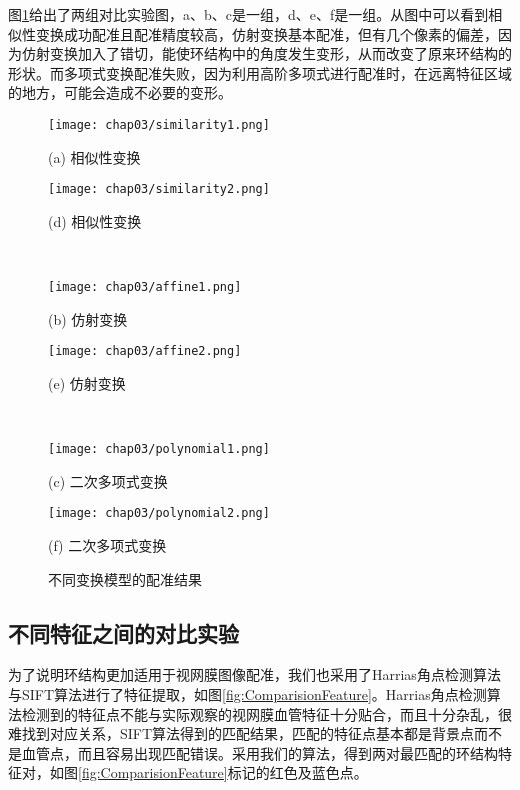 图\ref{fig:transform-fig}给出了两组对比实验图，a、b、c是一组，d、e、f是一组。从图中可以看到相似性变换成功配准且配准精度较高，仿射变换基本配准，但有几个像素的偏差，因为仿射变换加入了错切，能使环结构中的角度发生变形，从而改变了原来环结构的形状。而多项式变换配准失败，因为利用高阶多项式进行配准时，在远离特征区域的地方，可能会造成不必要的变形。
\begin{figure}
\centering

\begin{minipage}[b]{0.48\textwidth} 
      \centering 
      \texttt{[image: chap03/similarity1.png]}
        \centerline{(a) 相似性变换}\medskip
\end{minipage}
  \begin{minipage}[b]{0.48\textwidth}
    \centering
    \texttt{[image: chap03/similarity2.png]}
      \centerline{(d) 相似性变换}\medskip
  \end{minipage}
\\
  \begin{minipage}[b]{0.48\textwidth}
    \centering
    \texttt{[image: chap03/affine1.png]}
      \centerline{(b) 仿射变换}\medskip
  \end{minipage}
 \begin{minipage}[b]{0.48\textwidth}
    \centering
      \texttt{[image: chap03/affine2.png]}
        \centerline{(e) 仿射变换}\medskip
    \end{minipage}
\\
\begin{minipage}[b]{0.48\textwidth}
	\centering
      \texttt{[image: chap03/polynomial1.png]}
        \centerline{(c) 二次多项式变换}\medskip
    \end{minipage}
  \begin{minipage}[b]{0.48\textwidth}
    \centering
    \texttt{[image: chap03/polynomial2.png]}
      \centerline{(f) 二次多项式变换}\medskip
  \end{minipage}
\caption{不同变换模型的配准结果}
\label{fig:transform-fig}
\end{figure}

\subsection{不同特征之间的对比实验}


为了说明环结构更加适用于视网膜图像配准，我们也采用了Harrias角点检测算法与SIFT算法进行了特征提取，如图\ref{fig:ComparisionFeature}。Harrias角点检测算法检测到的特征点不能与实际观察的视网膜血管特征十分贴合，而且十分杂乱，很难找到对应关系，SIFT算法得到的匹配结果，匹配的特征点基本都是背景点而不是血管点，而且容易出现匹配错误。采用我们的算法，得到两对最匹配的环结构特征对，如图\ref{fig:ComparisionFeature}标记的红色及蓝色点。


